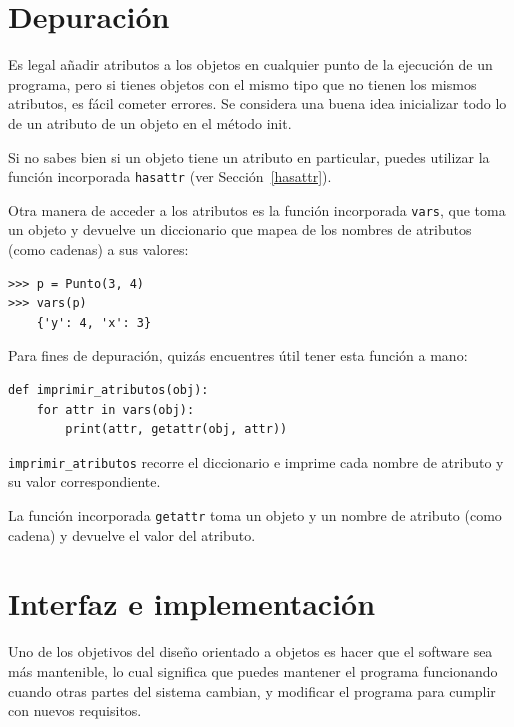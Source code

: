 \documentclass[10pt]{book}
\begin{document}
\section{Depuración}

Es legal añadir atributos a los objetos en cualquier punto de la ejecución
de un programa, pero si tienes objetos con el mismo tipo que no
tienen los mismos atributos, es fácil cometer errores.
Se considera una buena idea
inicializar todo lo de un atributo de un objeto en el método init.

Si no sabes bien si un objeto tiene un atributo en particular,
puedes utilizar la función incorporada {\tt hasattr} (ver Sección~\ref{hasattr}).

Otra manera de acceder a los atributos es la función incorporada {\tt vars},
que toma un objeto y devuelve un diccionario que mapea de los nombres
de atributos (como cadenas) a sus valores:

\begin{verbatim}
>>> p = Punto(3, 4)
>>> vars(p)
    {'y': 4, 'x': 3}
\end{verbatim}
%
Para fines de depuración, quizás encuentres útil tener esta
función a mano:

\begin{verbatim}
def imprimir_atributos(obj):
    for attr in vars(obj):
        print(attr, getattr(obj, attr))
\end{verbatim}
%
\verb"imprimir_atributos" recorre el diccionario
e imprime cada nombre de atributo y su valor correspondiente.

La función incorporada {\tt getattr} toma un objeto y un nombre
de atributo (como cadena) y devuelve el valor del atributo.


\section{Interfaz e implementación}

Uno de los objetivos del diseño orientado a objetos es hacer que el software sea más
mantenible, lo cual significa que puedes mantener el programa funcionando cuando
otras partes del sistema cambian, y modificar el programa para cumplir con nuevos
requisitos.
\end{document}
